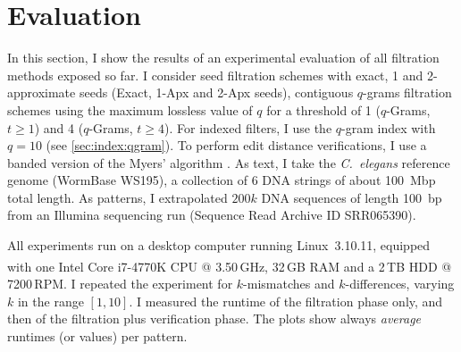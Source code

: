 


\section{Evaluation}
\label{sec:filtering:evaluation}

In this section, I show the results of an experimental evaluation of all filtration methods exposed so far.
I consider seed filtration schemes with exact, 1 and 2-approximate seeds (Exact, 1-Apx and 2-Apx seeds), contiguous $q$-grams filtration schemes using the maximum lossless value of $q$ for a threshold of 1 ($q$-Grams, $t \geq 1$) and 4 ($q$-Grams, $t \geq 4$).
For indexed filters, I use the $q$-gram index with $q=10$ (see \ref{sec:index:qgram}).
To perform edit distance verifications, I use a banded version of the Myers' algorithm \citep{Myers1999}.
As text, I take the \emph{C.~elegans} reference genome (WormBase WS195), \ie a collection of 6 DNA strings of about 100~Mbp total length.
As patterns, I extrapolated $200k$ DNA sequences of length 100~bp from an Illumina sequencing run (Sequence Read Archive ID SRR065390).

All experiments run on a desktop computer running Linux~3.10.11, equipped with one Intel\textsuperscript{\textregistered} Core i7-4770K CPU @ 3.50\,GHz, 32\,GB RAM and a 2\,TB HDD @ 7200\,RPM.
I repeated the experiment for $k$-mismatches and $k$-differences, varying $k$ in the range $[1,10]$.
I measured the runtime of the filtration phase only, and then of the filtration plus verification phase.
The plots show always \emph{average} runtimes (or values) per pattern.

